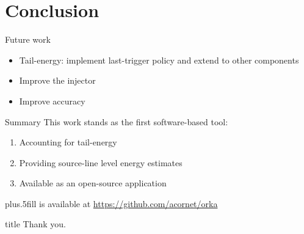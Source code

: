 \section{Conclusion}
\begin{frame}{Future work}
\begin{itemize}
\item Tail-energy: implement last-trigger policy and extend to other components
\item Improve the injector
\item Improve accuracy
\end{itemize}
\end{frame}
%
%
\begin{frame}{Summary}
This work stands as the first software-based tool:
\begin{enumerate}
\item Accounting for \alert{tail-energy}
\item Providing \alert{source-line level} energy estimates
\item Available as an \alert{open-source} application
\end{enumerate}
\vskip0pt plus.5fill
{\small \orka{} is available at \url{https://github.com/acornet/orka}}
\end{frame}
%
%
\begin{frame}
  \vfill
  \centering
  \begin{beamercolorbox}[sep=8pt,center,shadow=true,rounded=true]{title}
    Thank you.\par%
  \end{beamercolorbox}
  \vfill
\end{frame}
%
%
